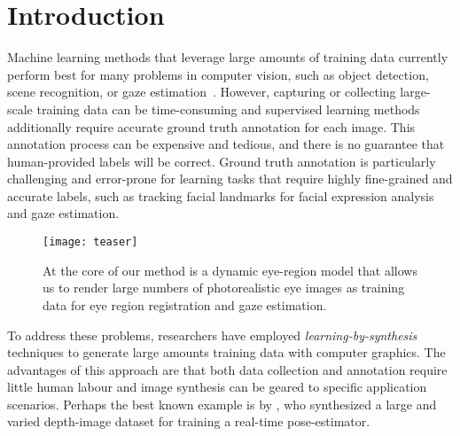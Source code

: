 
\section{Introduction}


Machine learning methods that leverage large amounts of training data currently perform best for many problems in computer vision, such as object detection, scene recognition, or gaze estimation~\cite{zhou2014learning,girshick2014rich,zhang15_cvpr}.
However, capturing or collecting large-scale training data can be time-consuming
and supervised learning methods additionally require accurate ground truth annotation for each image.
This annotation process can be expensive and tedious, and there is no guarantee that human-provided labels will be correct.
Ground truth annotation is particularly challenging and error-prone for learning tasks that require highly fine-grained and accurate labels, such as tracking facial landmarks for facial expression analysis and gaze estimation.

\begin{figure}
    \texttt{[image: teaser]}
    \caption{At the core of our method is a dynamic eye-region model that allows us to render large numbers of photorealistic eye images as training data for eye region registration and gaze estimation.}
    \label{fig:teaser}
\end{figure}

To address these problems, researchers have employed \emph{learning-by-synthesis} techniques to generate large amounts training data with computer graphics.
The advantages of this approach are that both data collection and annotation require little human labour and image synthesis can be geared to specific application scenarios.
Perhaps the best known example is by \citet{shotton2013real}, who synthesized a large and varied depth-image dataset for training a real-time pose-estimator.

